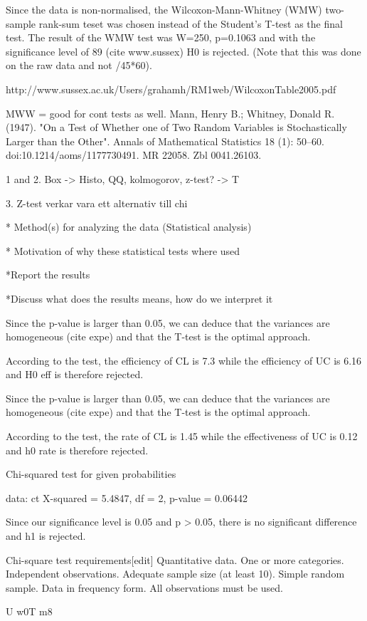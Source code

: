 \documentclass[10pt,twocolumn]{article}
\begin{document}
Since the data is non-normalised, the Wilcoxon-Mann-Whitney (WMW) two-sample rank-sum teset was chosen instead of the Student's T-test as the final test. The result of the WMW test was W=250, p=0.1063 and with the significance level of 89 (cite www.sussex) H0 is rejected. (Note that this was done on the raw data and not /45*60).


http://www.sussex.ac.uk/Users/grahamh/RM1web/WilcoxonTable2005.pdf



MWW = good for cont tests as well.
 Mann, Henry B.; Whitney, Donald R. (1947). "On a Test of Whether one of Two Random Variables is Stochastically Larger than the Other". Annals of Mathematical Statistics 18 (1): 50–60. doi:10.1214/aoms/1177730491. MR 22058. Zbl 0041.26103.

1 and 2.
Box
->
Histo, QQ, kolmogorov, z-test?
->
T

3.
Z-test verkar vara ett alternativ till chi

* Method(s) for analyzing the data (Statistical analysis)

* Motivation of why these statistical tests where used


*Report the results

*Discuss what does the results means, how do we interpret it




Since the p-value is larger than 0.05, we can deduce that the variances are homogeneous (cite expe) and that the T-test is the optimal approach.



According to the test, the efficiency of CL is 7.3 while the efficiency of UC is 6.16 and H0 eff is therefore rejected. 






Since the p-value is larger than 0.05, we can deduce that the variances are homogeneous (cite expe) and that the T-test is the optimal approach.




According to the test, the rate of CL is 1.45 while the effectiveness of UC is 0.12 and h0 rate is therefore rejected. 


	Chi-squared test for given probabilities

data:  ct
X-squared = 5.4847, df = 2, p-value = 0.06442

Since our significance level is 0.05 and p > 0.05, there is no significant difference and h1 is rejected. 


Chi-square test requirements[edit]
Quantitative data.
One or more categories.
Independent observations.
Adequate sample size (at least 10).
Simple random sample.
Data in frequency form.
All observations must be used.




U w0T m8
\end{document}
